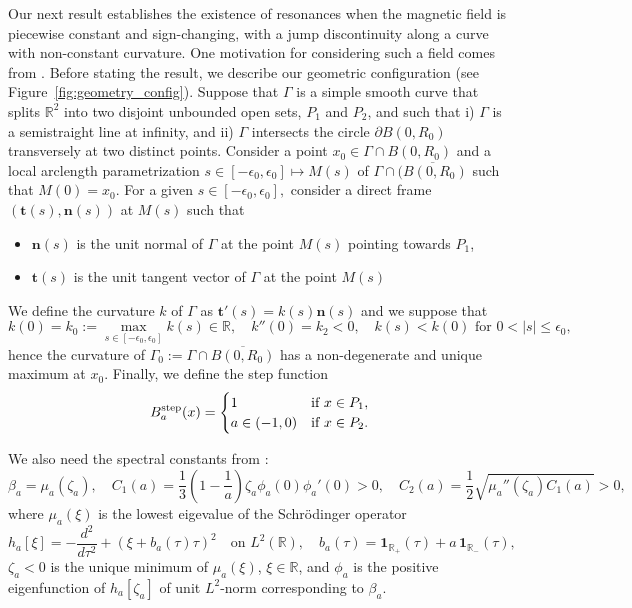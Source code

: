 \documentclass[11pt]{amsart}
\theoremstyle{remark}
\newcommand{\R}{\mathbb{R}}
\numberwithin{equation}{section}
\begin{document}
Our next result establishes the existence of resonances when the magnetic field is piecewise constant and sign-changing, with a jump discontinuity along a curve with non-constant curvature. One motivation for considering such a field comes from \cite{RP, RPM}. Before stating the result, we describe our geometric configuration (see Figure~\ref{fig:geometry_config}). Suppose that $\Gamma$ is
a simple smooth curve that splits $\R^2$ into two disjoint unbounded open sets, $P_1$ and $P_2$, and such
that i) $\Gamma$ is a semistraight line at infinity, and ii) $\Gamma$  intersects the circle $\partial B(0,R_0)$ transversely at two distinct points. Consider a point $x_0\in \Gamma\cap B(0,R_0)$ and a local arclength parametrization $s\in[-\epsilon_0,\epsilon_0]\mapsto M(s)$ of $\Gamma\cap \overline{(B(0,R_0)}$ such that $M(0)=x_0$. For a given $s\in[-\epsilon_0,\epsilon_0],$ consider a direct frame $(\mathbf t(s),\mathbf n(s))$ at $M(s)$ such that
\begin{itemize}
    \item $\mathbf n(s)$ is the unit normal of $\Gamma$ at the point $M(s)$ pointing towards $P_1$,
    \item $\mathbf t(s)$ is the unit tangent vector of $\Gamma$ at the point $M(s)$
\end{itemize}
%
We define the curvature $k$ of $\Gamma$ as $\mathbf t'(s) = k(s)\mathbf n(s)$ and we suppose that 
\[k(0)=k_0:=\max_{s\in[-\epsilon_0,\epsilon_0]}k(s)\in\R,\quad k''(0)=k_2<0,\quad k(s)<k(0) \mbox{ for }0<|s|\leq \epsilon_0,\]
hence the curvature of $\Gamma_0:=\Gamma\cap \overline{B(0,R_0)}$ has a non-degenerate and unique maximum at $x_0$.  Finally, we define the step function
\begin{equation}\label{eq:m-step}
B^{\rm step}_a(x)=\begin{cases}
    1&\mbox{if }x\in P_1,\\
    a\in(-1,0)&\mbox{if }x\in P_2.
\end{cases}
\end{equation}

We also need the spectral constants from \cite[(1.8)--(1.12)]{AHK}:
\begin{equation}\label{eq:spect-cst}
\beta_a=\mu_a(\zeta_a),\quad C_1(a)=\frac{1}{3}\left(1-\frac{1}{a}\right)\zeta_a\phi_a(0)\phi_a'(0) >0,\quad C_2(a)=\frac12\sqrt{\mu_a''(\zeta_a)C_1(a)}>0,
\end{equation}
where $\mu_a(\xi)$ is the lowest eigevalue of the Schr\"odinger operator 
\[h_a[\xi]=-\frac{d^2}{d\tau^2} + (\xi + b_a(\tau)\tau)^2 \quad \text{on } L^2(\mathbb{R}), \quad  b_a(\tau) = \mathbf{1}_{\mathbb{R}_+}(\tau) + a\,\mathbf{1}_{\mathbb{R}_-}(\tau),\]
$\zeta_a<0$ is the unique minimum of $\mu_a(\xi)$, $\xi\in\R$, and \(\phi_a\) is the positive eigenfunction of \(h_a[\zeta_a]\) of unit \(L^2\)-norm corresponding to \(\beta_a\).
\end{document}
